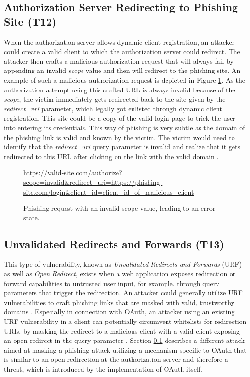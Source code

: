 \subsection[Authorization Server Redirecting to Phishing Site]{Authorization Server Redirecting to Phishing Site (T12)}
\label{threat:T12}
When the authorization server allows dynamic client registration, an attacker could create a valid client to which the authorization server could redirect. The attacker then crafts a malicious authorization request that will always fail by appending an invalid \emph{scope} value and then will redirect to the phishing site. An example of such a malicious authorization request is depicted in Figure \ref{fig:phishing_requests}. As the authorization attempt using this crafted URL is always invalid because of the \emph{scope}, the victim immediately gets redirected back to the site given by the \emph{redirect\_uri} parameter, which legally got enlisted through dynamic client registration. This site could be a copy of the valid login page to trick the user into entering its credentials. This way of phishing is very subtle as the domain of the phishing link is valid and known by the victim. The victim would need to identify that the \emph{redirect\_uri} query parameter is invalid and realize that it gets redirected to this URL after clicking on the link with the valid domain \cite{lodderstedt2020oauth}.


\begin{figure}[ht]
	\sffamily\footnotesize
	\url{https://valid-site.com/authorize?scope=invalid&redirect_uri=https://phishing-site.com/login&client_id=client_id_of_malicious_client}
	\linethickness{0.4pt}
	\caption{Phishing request with an invalid scope value, leading to an error state.}
	\label{fig:phishing_requests}
\end{figure}

\subsection[Unvalidated Redirects and Forwards]{Unvalidated Redirects and Forwards (T13)}
\label{threat:T13}
This type of vulnerability, known as \emph{Unvalidated Redirects and Forwards} (URF) as well as \emph{Open Redirect}, exists when a web application exposes redirection or forward capabilities to untrusted user input, for example, through query parameters that trigger the redirection. An attacker could generally utilize URF vulnerabilities to craft phishing links that are masked with valid, trustworthy domains \cite{wang2015urfds}. Especially in connection with OAuth, an attacker using an existing URF vulnerability in a client can potentially circumvent whitelists for redirection URIs, by masking the redirect to a malicious client with a valid client exposing an open redirect in the query parameter \cite{lodderstedt2020oauth}. Section \ref{threat:T12} describes a different attack aimed at masking a phishing attack utilizing a mechanism specific to OAuth that is similar to an open redirection at the authorization server and therefore a threat, which is introduced by the implementation of OAuth itself.

